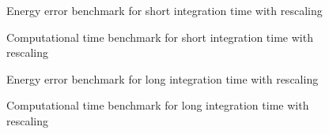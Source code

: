 \documentclass{beamer}
\begin{document}

\begin{frame}
	\begin{figure}
		
		\caption{Energy error benchmark for short integration time with rescaling}
	\end{figure}
\end{frame}


\begin{frame}
	\begin{figure}
		
		\caption{Computational time benchmark for short integration time with rescaling}
	\end{figure}
\end{frame}


\begin{frame}
	\begin{figure}
		
		\caption{Energy error benchmark for long integration time with rescaling}
	\end{figure}
\end{frame}


\begin{frame}
	\begin{figure}
		
		\caption{Computational time benchmark for long integration time with rescaling}
	\end{figure}
\end{frame}

\end{document}
